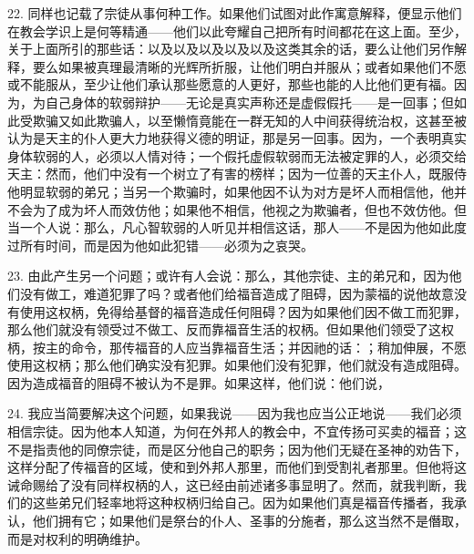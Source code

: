 22. 同样也记载了宗徒从事何种工作。如果他们试图对此作寓意解释，便显示他们在教会学识上是何等精通——他们以此夸耀自己把所有时间都花在这上面。至少，关于上面所引的那些话：以及以及以及以及以及这类其余的话，要么让他们另作解释，要么如果被真理最清晰的光辉所折服，让他们明白并服从；或者如果他们不愿或不能服从，至少让他们承认那些愿意的人更好，那些也能的人比他们更有福。因为，为自己身体的软弱辩护——无论是真实声称还是虚假假托——是一回事；但如此受欺骗又如此欺骗人，以至懒惰竟能在一群无知的人中间获得统治权，这甚至被认为是天主的仆人更大力地获得义德的明证，那是另一回事。因为，一个表明真实身体软弱的人，必须以人情对待；一个假托虚假软弱而无法被定罪的人，必须交给天主：然而，他们中没有一个树立了有害的榜样；因为一位善的天主仆人，既服侍他明显软弱的弟兄；当另一个欺骗时，如果他因不认为对方是坏人而相信他，他并不会为了成为坏人而效仿他；如果他不相信，他视之为欺骗者，但也不效仿他。但当一个人说：那么，凡心智软弱的人听见并相信这话，那人——不是因为他如此度过所有时间，而是因为他如此犯错——必须为之哀哭。\par

23. 由此产生另一个问题；或许有人会说：那么，其他宗徒、主的弟兄和，因为他们没有做工，难道犯罪了吗？或者他们给福音造成了阻碍，因为蒙福的说他故意没有使用这权柄，免得给基督的福音造成任何阻碍？因为如果他们因不做工而犯罪，那么他们就没有领受过不做工、反而靠福音生活的权柄。但如果他们领受了这权柄，按主的命令，那传福音的人应当靠福音生活；并因祂的话：；稍加伸展，不愿使用这权柄；那么他们确实没有犯罪。如果他们没有犯罪，他们就没有造成阻碍。因为造成福音的阻碍不被认为不是罪。如果这样，他们说：他们说，\par

24. 我应当简要解决这个问题，如果我说——因为我也应当公正地说——我们必须相信宗徒。因为他本人知道，为何在外邦人的教会中，不宜传扬可买卖的福音；这不是指责他的同僚宗徒，而是区分他自己的职务；因为他们无疑在圣神的劝告下，这样分配了传福音的区域，使和到外邦人那里，而他们到受割礼者那里。但他将这诫命赐给了没有同样权柄的人，这已经由前述诸多事显明了。然而，就我判断，我们的这些弟兄们轻率地将这种权柄归给自己。因为如果他们真是福音传播者，我承认，他们拥有它；如果他们是祭台的仆人、圣事的分施者，那么这当然不是僭取，而是对权利的明确维护。\par

